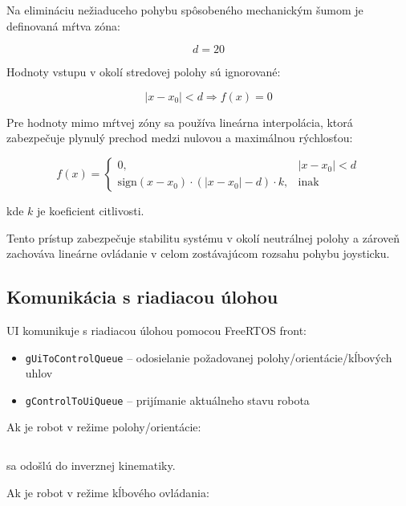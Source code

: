 Na elimináciu nežiaduceho pohybu spôsobeného mechanickým šumom je definovaná mŕtva zóna:

\begin{equation}
d = 20
\end{equation}

Hodnoty vstupu v okolí stredovej polohy sú ignorované:

\begin{equation}
|x - x_0| < d \Rightarrow f(x) = 0
\end{equation}

Pre hodnoty mimo mŕtvej zóny sa používa lineárna interpolácia, ktorá zabezpečuje plynulý prechod medzi nulovou a maximálnou rýchlosťou:

\begin{equation}
f(x) =
\begin{cases}
0, & |x - x_0| < d \\
\mathrm{sign}(x-x_0)\cdot (|x-x_0| - d)\cdot k, & \text{inak}
\end{cases}
\end{equation}

kde $k$ je koeficient citlivosti.

Tento prístup zabezpečuje stabilitu systému v okolí neutrálnej polohy a zároveň zachováva lineárne ovládanie v celom zostávajúcom rozsahu pohybu joysticku.

\subsection{Komunikácia s riadiacou úlohou}

UI komunikuje s riadiacou úlohou pomocou FreeRTOS front:

\begin{itemize}
    \item \texttt{gUiToControlQueue} -- odosielanie požadovanej polohy/orientácie/kĺbových uhlov
    \item \texttt{gControlToUiQueue} -- prijímanie aktuálneho stavu robota
\end{itemize}

Ak je robot v režime polohy/orientácie:

\begin{equation}
[x,y,z,R,P,Y]
\end{equation}

sa odošlú do inverznej kinematiky.

Ak je robot v režime kĺbového ovládania:

\begin{equation}
[\theta_1,\theta_2,\theta_3,\theta_4,\theta_5,\theta_6]
\end{equation}

